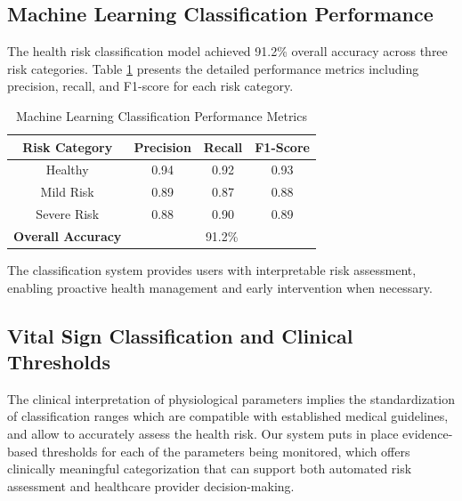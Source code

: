 \documentclass{ieeeaccess}
\begin{document}
\subsection{Machine Learning Classification Performance}

The health risk classification model achieved 91.2\% overall accuracy across three risk categories. Table \ref{tab:ml_performance} presents the detailed performance metrics including precision, recall, and F1-score for each risk category.

\begin{table}[h]
\centering
\caption{Machine Learning Classification Performance Metrics}
\label{tab:ml_performance}
\begin{tabular}{|c|c|c|c|}
\hline
\textbf{Risk Category} & \textbf{Precision} & \textbf{Recall} & \textbf{F1-Score} \\
\hline
Healthy & 0.94 & 0.92 & 0.93 \\
Mild Risk & 0.89 & 0.87 & 0.88 \\
Severe Risk & 0.88 & 0.90 & 0.89 \\
\hline
\textbf{Overall Accuracy} & \multicolumn{3}{c|}{91.2\%} \\
\hline
\end{tabular}
\end{table}

The classification system provides users with interpretable risk assessment, enabling proactive health management and early intervention when necessary.

\subsection{Vital Sign Classification and Clinical Thresholds}

The clinical interpretation of physiological parameters implies the standardization of classification ranges which are compatible with established medical guidelines, and allow to accurately assess the health risk. Our system puts in place evidence-based thresholds for each of the parameters being monitored, which offers clinically meaningful categorization that can support both automated risk assessment and healthcare provider decision-making.
\end{document}
